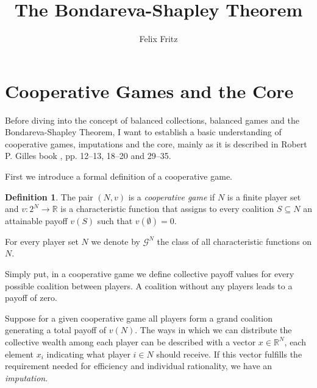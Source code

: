 \documentclass[10pt,a4paper,titlepage]{article}
\author{Felix Fritz}
\title{The Bondareva-Shapley Theorem}
\theoremstyle{plain}
\theoremstyle{definition}
\newtheorem{defn}[thm]{Definition} %
\begin{document}
\maketitle

\tableofcontents
\pagebreak

\section{Cooperative Games and the Core}
 Before diving into the concept of balanced collections, balanced games and the Bondareva-Shapley Theorem, I want to establish a basic understanding of cooperative games, imputations and the core, mainly as it is described in Robert P. Gilles book \cite{gilles}, pp. 12--13, 18--20 and 29--35.

 First we introduce a formal definition of a cooperative game.

\begin{defn}
    The pair $(N, v)$ is a \textit{cooperative game} if $N$ is a finite player set and $v: 2^N \rightarrow \mathbb{R}$ is a characteristic function that assigns to every coalition $S \subseteq N$ an attainable payoff $v(S)$ such that $v(\emptyset) = 0$.
    
    For every player set $N$ we denote by $\mathcal{G}^N$ the class of all characteristic functions on $N$.
\end{defn}
Simply put, in a cooperative game we define collective payoff values for every possible coalition between players. A coalition without any players leads to a payoff of zero.

Suppose for a given cooperative game all players form a grand coalition generating a total payoff of $v(N)$. The ways in which we can distribute the collective wealth among each player can be described with a vector $x \in \mathbb{R}^N$, each element $x_i$ indicating what player $i \in N$ should receive.
If this vector fulfills the requirement needed for efficiency and individual rationality, we have an \textit{imputation}.
\end{document}
